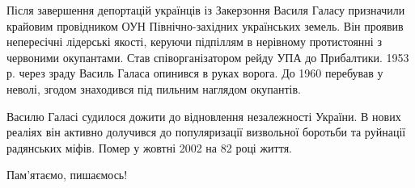 Після завершення депортацій українців із Закерзоння Василя Галасу призначили
крайовим провідником ОУН Північно-західних українських земель. Він проявив
непересічні лідерські якості, керуючи підпіллям в нерівному протистоянні з
червоними окупантами. Став співорганізатором рейду УПА до Прибалтики. 1953 р.
через зраду Василь Галаса опинився в руках ворога. До 1960 перебував у неволі,
згодом знаходився під пильним наглядом окупантів.

Василю Галасі судилося дожити до відновлення незалежності України. В нових
реаліях він активно долучився до популяризації визвольної боротьби та руйнації
радянських міфів. Помер у жовтні 2002 на 82 році життя.

Пам’ятаємо, пишаємось!
